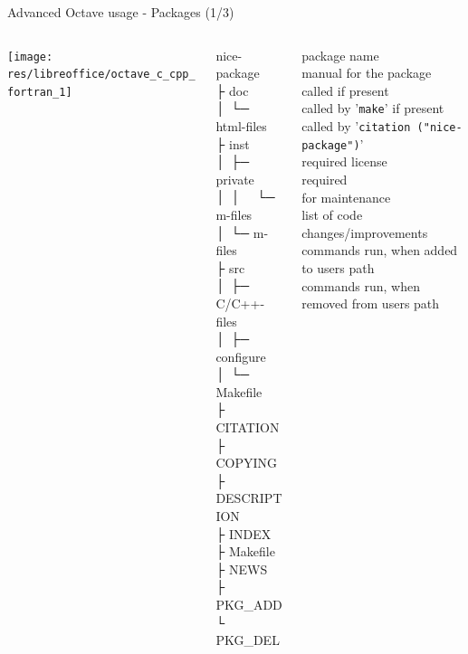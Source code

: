 \begin{frame}{Advanced Octave usage - Packages (1/3)}
\begin{columns}
\begin{column}[t]{0.2\textwidth}
\texttt{[image: res/libreoffice/octave\_c\_cpp\_fortran\_1]}
\end{column}
\begin{column}{0.2\textwidth}
\ttfamily\scriptsize
\colorbox{green!30}{nice-package} \\
├ \colorbox{orange!30}{doc} \\
│ └─ html-files \\
├ \colorbox{orange!30}{inst} \\
│ ├─ \colorbox{orange!30}{private} \\
│ │ \ \ └─ m-files \\
│ └─ m-files \\
├ \colorbox{orange!30}{src} \\
│ ├─ C/C++-files \\
│ ├─ configure \\
│ └─ Makefile \\
├ CITATION \\
├ {\color{red!50!black}COPYING}  \\
├ {\color{red!50!black}DESCRIPTION} \\
├ INDEX    \\
├ Makefile \\
├ NEWS     \\
├ PKG\_ADD \\
└ PKG\_DEL \\
\end{column}
\begin{column}{0.5\textwidth}
\color{green!50!black}\scriptsize
package name \\[2em]
manual for the package \\[8em]
called if present \\
called by '\texttt{make}' if present \\
called by '\texttt{citation ("nice-package")}' \\
{\color{red!50!black}required} license \\
{\color{red!50!black}required} \\[1em]
for maintenance \\
list of code changes/improvements \\
commands run, when added   to   users path \\
commands run, when removed from users path
\end{column}
\end{columns}
\end{frame}



